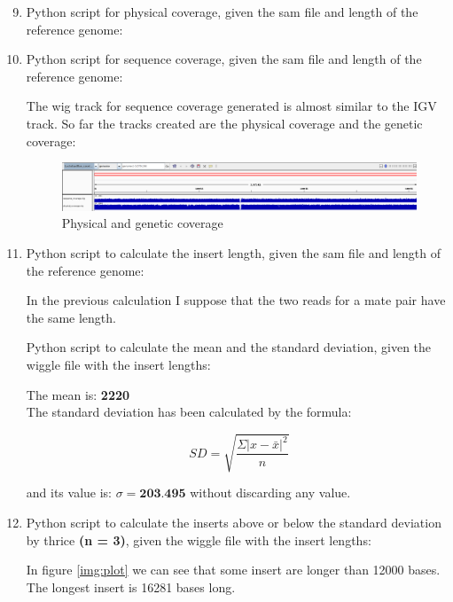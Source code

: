 \begin{enumerate}
\setcounter{enumi}{8}
  \item Python script for physical coverage, given the sam file and
length of the reference genome:

  \item Python script for sequence coverage, given the sam file and
length of the reference genome:

The wig track for sequence coverage generated is almost similar to the IGV
track.
So far the tracks created are the physical coverage and the genetic coverage:

\begin{figure}[h]
  \centering
  \includegraphics[scale=0.2]{img/ps_tracks}
  \caption{Physical and genetic coverage}
\end{figure}

  \item Python script to calculate the insert length, given the sam file and
length of the reference genome:


In the previous calculation I suppose that the two reads for a mate pair have
the same length.

Python script to calculate the mean and the standard deviation, given the
wiggle file with the insert lengths:


The mean is: \textbf{2220} \\

The standard deviation has been calculated by the formula: 

\begin{equation}
SD = \sqrt{\frac{\Sigma|x-\bar{x}|^2}{n}}
\end{equation}

and its value is: $\sigma = \textbf{203.495}$ without discarding any value.

  \item Python script to calculate the inserts above or below the standard
deviation by thrice \textbf{(n = 3)}, given the wiggle file with the insert
lengths:


In figure \ref{img:plot} we can see that some insert are longer than 12000 bases.
The longest insert is 16281 bases long.


\end{enumerate}
